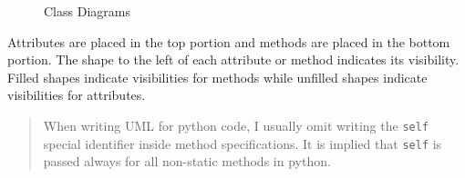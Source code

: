 \begin{figure}
\centering
\pandocbounded{}
\caption{Class Diagrams}
\end{figure}

Attributes are placed in the top portion and methods are placed in the
bottom portion. The shape to the left of each attribute or method
indicates its visibility. Filled shapes indicate visibilities for
methods while unfilled shapes indicate visibilities for attributes.

\begin{quote}
When writing UML for python code, I usually omit writing the
\texttt{self} special identifier inside method specifications. It is
implied that \texttt{self} is passed always for all non-static methods
in python.
\end{quote}

